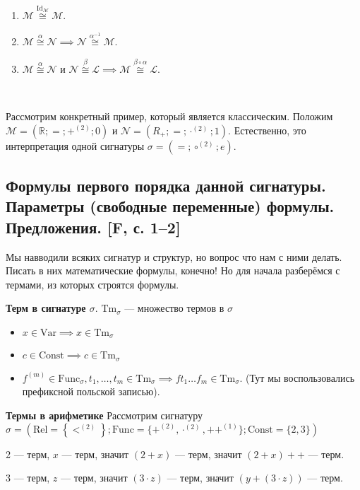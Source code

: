 \documentclass[a4paper, fleqn]{article}
\begin{document}
    \begin{proposition}
        \begin{enumerate}
            \item $\mathcal{M} \overset{\text{Id}_{\mathcal{M}}}{\cong} \mathcal{M}$.
            \item $\mathcal{M} \overset{\alpha}{\cong} \mathcal{N} \implies \mathcal{N} \overset{\alpha^{-1}}{\cong} \mathcal{M}$.
            \item $\mathcal{M} \overset{\alpha}{\cong} \mathcal{N}$ и $\mathcal{N} \overset{\beta}{\cong} \mathcal{L} \implies \mathcal{M} \overset{\beta \circ \alpha}{\cong} \mathcal{L}$.
        \end{enumerate}
    \end{proposition}~
    \begin{example}
    Рассмотрим конкретный пример, который является классическим.
    Положим $\mathcal{M} = \left( \mathbb{R}; =; +^{(2)}; 0 \right)$ и $\mathcal{N} = \left( R_{+}; =; \cdot^{(2)}; 1 \right)$.
    Естественно, это интерпретация одной сигнатуры $\sigma = \left( =; \circ^{(2)}; e \right)$.
    \end{example}
    \subsection{Формулы первого порядка данной сигнатуры. Параметры (свободные переменные) формулы. Предложения. [F, с. 1–2]}
    Мы навводили всяких сигнатур и структур, но вопрос что нам с ними делать. Писать в них
    математические формулы, конечно! Но для начала разберёмся с термами, из которых строятся формулы.

    \begin{definition}
        \textbf{Терм в сигнатуре $\sigma$}. $\text{Tm}_\sigma$ --- множество термов в $\sigma$
        \begin{itemize}
            \item $x \in \text{Var} \implies x \in \text{Tm}_\sigma$
            \item $c \in \text{Const} \implies c \in \text{Tm}_\sigma$
            \item $f^{(m)} \in \text{Func}_\sigma, t_1, \dots, t_m \in \text{Tm}_\sigma
            \implies f t_1 \dots f_m \in \text{Tm}_\sigma$. (Тут мы воспользовались префиксной 
            польской записью).
        \end{itemize}
    \end{definition}

    \begin{example}
        \textbf{Термы в арифметике}
        Рассмотрим сигнатуру $\sigma = (\text{Rel} = \left\{ <^{(2)} \right\} ; \text{Func}=\{+^{(2)}, \cdot^{(2)},
        ++^{(1)}\}; \text{Const}=\{2,3\})$

        2 --- терм, $x$ --- терм, значит $(2 + x)$ --- терм, значит $(2 + x)++$ --- терм.

        3 --- терм, $z$ --- терм, значит $(3 \cdot z)$ --- терм, значит $(y + (3 \cdot z))$ --- терм.
    \end{example}
\end{document}
